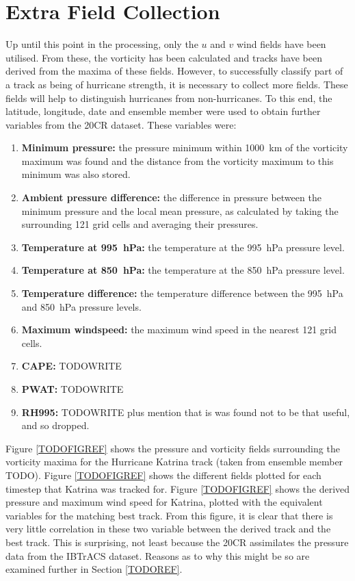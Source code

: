\documentclass[pdftex,12pt,a4paper]{report}
\begin{document}

\newpage
\section{Extra Field Collection}

Up until this point in the processing, only the $u$ and $v$ wind fields have been utilised. From
these, the vorticity has been calculated and tracks have been derived from the maxima of these
fields.  However, to successfully classify part of a track as being of hurricane strength, it is
necessary to collect more fields. These fields will help to distinguish hurricanes from
non-hurricanes. To this end, the latitude, longitude, date and ensemble member were used to obtain
further variables from the 20CR dataset. These variables were:

\begin{enumerate}
    \item \textbf{Minimum pressure:} the pressure minimum within \SI{1000}{km} of the vorticity
        maximum was found and the distance from the vorticity maximum to this minimum was also stored.
    \item \textbf{Ambient pressure difference:} the difference in pressure between the minimum
        pressure and the local mean pressure, as calculated by taking the surrounding 121 grid cells
        and averaging their pressures.
    \item \textbf{Temperature at \SI{995}{hPa}:} the temperature at the \SI{995}{hPa} pressure
        level.
    \item \textbf{Temperature at \SI{850}{hPa}:} the temperature at the \SI{850}{hPa} pressure
        level.
    \item \textbf{Temperature difference:} the temperature difference between the \SI{995}{hPa} and
        \SI{850}{hPa} pressure levels.
    \item \textbf{Maximum windspeed:} the maximum wind speed in the nearest 121 grid cells.
    \item \textbf{CAPE:} TODOWRITE
    \item \textbf{PWAT:} TODOWRITE
    \item \textbf{RH995:} TODOWRITE plus mention that is was found not to be that useful, and so dropped.
\end{enumerate}

Figure \ref{TODOFIGREF} shows the pressure and vorticity fields surrounding the vorticity maxima for
the Hurricane Katrina track (taken from ensemble member TODO). Figure \ref{TODOFIGREF} shows the
different fields plotted for each timestep that Katrina was tracked for. Figure \ref{TODOFIGREF}
shows the derived pressure and maximum wind speed for Katrina, plotted with the equivalent variables
for the matching best track. From this figure, it is clear that there is very little correlation in
these two variable between the derived track and
the best track. This is surprising, not least because the 20CR assimilates the pressure data from
the IBTrACS dataset. Reasons as to why this might be so are examined further in Section
\ref{TODOREF}.
\end{document}
